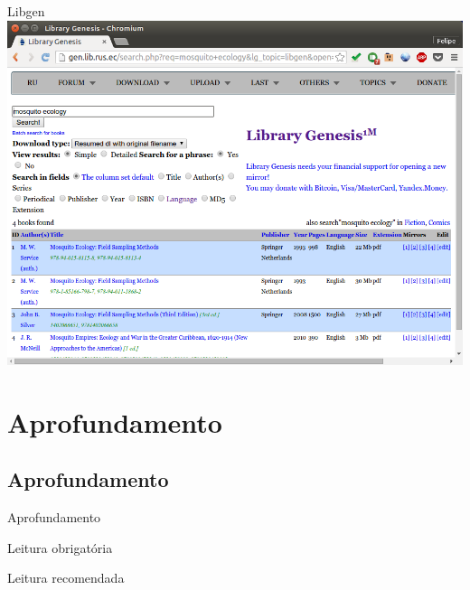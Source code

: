 \documentclass{beamer}
\begin{document}
\begin{frame}{Libgen}
  \includegraphics[height=.85\textheight]{Busca/libgen-busca2}
\end{frame}

\section{Aprofundamento}

\subsection{Aprofundamento}

\begin{frame}{Aprofundamento}
  \begin{block}{Leitura obrigatória}
  \end{block}
  \begin{block}{Leitura recomendada}
  \end{block}
\end{frame}
\end{document}
